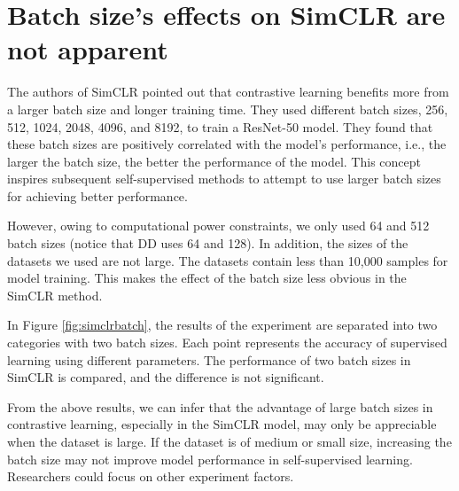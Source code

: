 \section{Batch size's effects on SimCLR are not apparent}

The authors of SimCLR \cite{SimCLR} pointed out that contrastive learning benefits more from a larger batch size and longer training time. They used different batch sizes, 256, 512, 1024, 2048, 4096, and 8192, to train a ResNet-50 model. They found that these batch sizes are positively correlated with the model's performance, i.e., the larger the batch size, the better the performance of the model. This concept inspires subsequent self-supervised methods to attempt to use larger batch sizes for achieving better performance. 

However, owing to computational power constraints, we only used 64 and 512 batch sizes (notice that DD uses 64 and 128). In addition, the sizes of the datasets we used are not large. The datasets contain less than 10,000 samples for model training. This makes the effect of the batch size less obvious in the SimCLR method. 

In Figure \ref{fig:simclrbatch}, the results of the experiment are separated into two categories with two batch sizes. Each point represents the accuracy of supervised learning using different parameters. The performance of two batch sizes in SimCLR is compared, and the difference is not significant.

From the above results, we can infer that the advantage of large batch sizes in contrastive learning, especially in the SimCLR model, may only be appreciable when the dataset is large. If the dataset is of medium or small size,  increasing the batch size may not improve model performance in self-supervised learning. Researchers could focus on other experiment factors.

